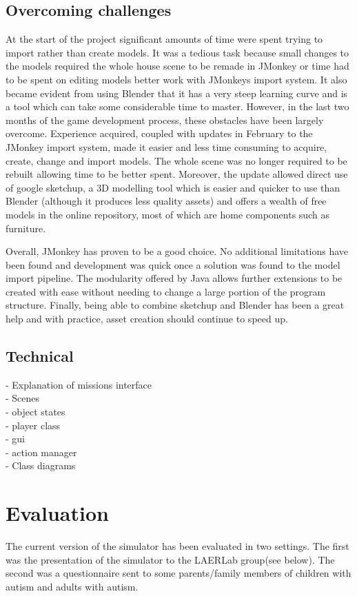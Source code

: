 \documentclass[11pt]{report}
\begin{document}
\subsection{Overcoming challenges}
At the start of the project significant amounts of time were spent trying to import rather than create models. It was a tedious task because small changes to the models required the whole house scene to be remade in JMonkey or
time had to be spent on editing models better work with JMonkeys import system. It also became evident from using Blender that it has a very steep learning curve and is a tool which can take some considerable time to master.
However, in the last two months of the game development process, these obstacles have been largely overcome. Experience acquired, coupled with updates in February to the JMonkey import system, made it easier and less
time consuming to acquire, create, change and import models. The whole scene was no longer required to be rebuilt allowing time to be better spent. Moreover, the update allowed direct use of google sketchup, a 3D modelling
tool which is easier and quicker to use than Blender (although it produces less quality assets) and offers a wealth of free models in the online repository, most of which are home components such as furniture.

Overall, JMonkey has proven to be a good choice. No additional limitations have been found and development was quick once a solution was found to the model import pipeline. The modularity offered by Java allows
further extensions to be created with ease without needing to change a large portion of the program structure. Finally, being able to combine sketchup and Blender has been a great help and with practice, asset creation should
continue to speed up.

\subsection{Technical}
- Explanation of missions interface \\
- Scenes\\
- object states\\
- player class\\
- gui\\
- action manager\\
- Class diagrams\\


\section{Evaluation}
The current version of the simulator has been evaluated in two settings. The first was the presentation of the simulator to the LAERLab group(see below). The second was a questionnaire sent to some parents/family members of children with autism and adults with autism.
\end{document}
